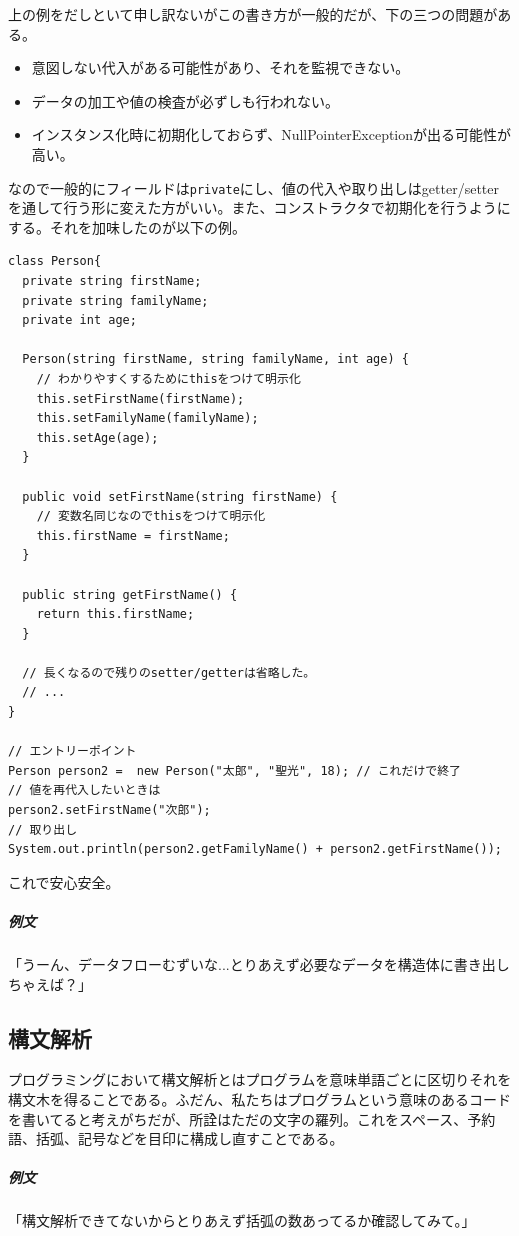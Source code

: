 \documentclass[a4paper]{ltjsreport}
\newcommand{\terlogy}[2][|]{\colorbox{terlogy}{\texttt{\lstinline#1#2#1}}}
\begin{document}
上の例をだしといて申し訳ないがこの書き方が一般的だが、下の三つの問題がある。
\begin{itemize}
  \item 意図しない代入がある可能性があり、それを監視できない。
  \item データの加工や値の検査が必ずしも行われない。
  \item インスタンス化時に初期化しておらず、NullPointerExceptionが出る可能性が高い。
\end{itemize}
なので一般的にフィールドは\terlogy{private}にし、値の代入や取り出しはgetter/setterを通して行う形に変えた方がいい。また、コンストラクタで初期化を行うようにする。それを加味したのが以下の例。

\lstset{language=Java}
\begin{lstlisting}
class Person{
  private string firstName;
  private string familyName;
  private int age;

  Person(string firstName, string familyName, int age) {
    // わかりやすくするためにthisをつけて明示化
    this.setFirstName(firstName);
    this.setFamilyName(familyName);
    this.setAge(age);
  }

  public void setFirstName(string firstName) {
    // 変数名同じなのでthisをつけて明示化
    this.firstName = firstName;
  }

  public string getFirstName() {
    return this.firstName;
  }

  // 長くなるので残りのsetter/getterは省略した。
  // ...
}

// エントリーポイント
Person person2 =  new Person("太郎", "聖光", 18); // これだけで終了
// 値を再代入したいときは
person2.setFirstName("次郎");
// 取り出し
System.out.println(person2.getFamilyName() + person2.getFirstName());
\end{lstlisting}
これで安心安全。

\subparagraph{例文} 「うーん、データフローむずいな...とりあえず必要なデータを構造体に書き出しちゃえば？」

\subsection{構文解析}
プログラミングにおいて構文解析とはプログラムを意味単語ごとに区切りそれを構文木を得ることである。ふだん、私たちはプログラムという意味のあるコードを書いてると考えがちだが、所詮はただの文字の羅列。これをスペース、予約語、括弧、記号などを目印に構成し直すことである。

\subparagraph{例文} 「構文解析できてないからとりあえず括弧の数あってるか確認してみて。」
\end{document}
